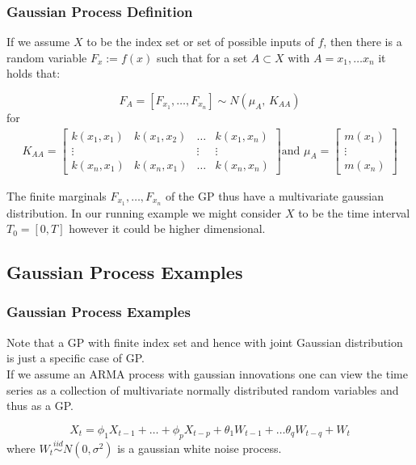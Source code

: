 \documentclass[
	8pt, %
]{beamer}
\begin{document}
\begin{frame}
	\frametitle{Gaussian Process Definition}


If we assume $X$ to be the index set or set of possible inputs of $f$, then there is a random variable
$F_x := f(x)$ such that for a set $A \subset X$ with $A={x_1, \dots x_n}$ it holds that:

\[F_A = [F_{x_1}, \dots , F_{x_n}] \sim N(\mu_A,\,K_{AA})\]
for
\begin{gather}\label{def:Kernel-Matrix}
    K_{AA} =
    \begin{bmatrix}
        k(x_1, x_1) & k(x_1, x_2) & \dots & k(x_1, x_n)\\
        \vdots  &  & \vdots  & \vdots \\
        k(x_n, x_1)  & k(x_n, x_1) & \dots  & k(x_n, x_n)
    \end{bmatrix} \text{and }
    \mu_A =
    \begin{bmatrix}
        m(x_1) \\
        \vdots \\
        m(x_n)
    \end{bmatrix}
\end{gather}

The finite marginals $F_{x_1}, \dots, F_{x_n}$ of the GP thus have a multivariate gaussian distribution.
In our running example we might consider $X$ to be the time interval $T_0=[0, T]$ however it could be higher dimensional.

\end{frame}

\subsection{Gaussian Process Examples}

\begin{frame}
	\frametitle{Gaussian Process Examples}
	Note that a GP with finite index set and hence with joint Gaussian distribution is just a specific case
of GP. \\

	If we assume an ARMA process with gaussian innovations one can view the time series
as a collection of multivariate normally distributed random variables and thus as a GP.

	\[
        X_t =  \phi_1 X_{t-1} + \dots + \phi_p X_{t-p} + \theta_1 W_{t-1} + \dots \theta_q W_{t-q} + W_t
    \]
    where $W_t \stackrel{iid}{\sim} N(0, \sigma^2)$ is a gaussian white noise process.


\end{frame}
\end{document}
